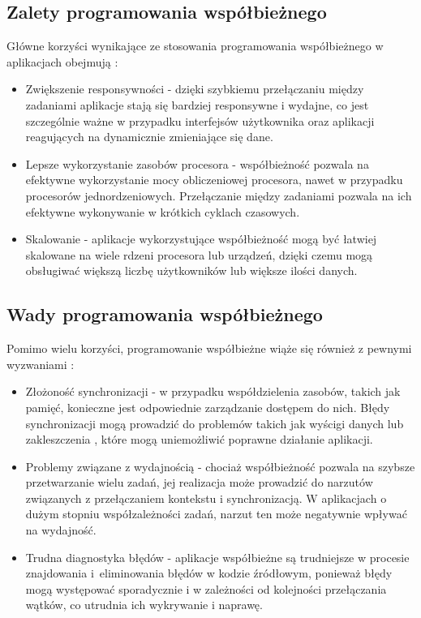 \subsection{Zalety programowania współbieżnego}
Główne korzyści wynikające ze stosowania programowania współbieżnego w aplikacjach obejmują \cite{ProsAndCons, ConcurrencyInAction}:
\begin{itemize}
    \item Zwiększenie responsywności - dzięki szybkiemu przełączaniu między zadaniami aplikacje stają się bardziej responsywne i wydajne, co jest szczególnie ważne w przypadku interfejsów użytkownika oraz aplikacji reagujących na dynamicznie zmieniające się dane.
    \item Lepsze wykorzystanie zasobów procesora - współbieżność pozwala na efektywne wykorzystanie mocy obliczeniowej procesora, nawet w przypadku procesorów jednordzeniowych. Przełączanie między zadaniami pozwala na ich efektywne wykonywanie w krótkich cyklach czasowych.
    \item Skalowanie - aplikacje wykorzystujące współbieżność mogą być łatwiej skalowane na wiele rdzeni procesora lub urządzeń, dzięki czemu mogą obsługiwać większą liczbę użytkowników lub większe ilości danych.
\end{itemize}

\subsection{Wady programowania współbieżnego}
Pomimo wielu korzyści, programowanie współbieżne wiąże się również z pewnymi wyzwaniami \cite{ProsAndCons, HandsOnConcurrencywithRust}:
\begin{itemize}
    \item Złożoność synchronizacji - w przypadku współdzielenia zasobów, takich jak pamięć, konieczne jest odpowiednie zarządzanie dostępem do nich. Błędy synchronizacji mogą prowadzić do problemów takich jak wyścigi danych  lub zakleszczenia , które mogą uniemożliwić poprawne działanie aplikacji.
    \item Problemy związane z wydajnością - chociaż współbieżność pozwala na szybsze przetwarzanie wielu zadań, jej realizacja może prowadzić do narzutów związanych z przełączaniem kontekstu i synchronizacją. W aplikacjach o dużym stopniu współzależności zadań, narzut ten może negatywnie wpływać na wydajność.
    \item Trudna diagnostyka błędów - aplikacje współbieżne są trudniejsze w procesie znajdowania i~eliminowania błędów w kodzie źródłowym, ponieważ błędy mogą występować sporadycznie i w zależności od kolejności przełączania wątków, co utrudnia ich wykrywanie i naprawę.
\end{itemize}

